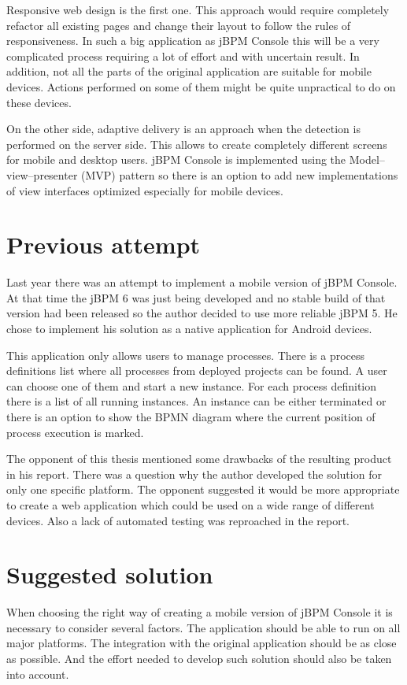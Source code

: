 \documentclass[12pt,oneside,final]{fithesis2}
\begin{document}
Responsive web design is the first one.
This approach would require completely refactor all existing pages and change their layout to follow the rules of responsiveness.
In such a big application as jBPM Console this will be a very complicated process requiring a lot of effort and with uncertain result.
In addition, not all the parts of the original application are suitable for mobile devices.
Actions performed on some of them might be quite unpractical to do on these devices.

On the other side, adaptive delivery is an approach when the detection is performed on the server side.
This allows to create completely different screens for mobile and desktop users.
jBPM Console is implemented using the Model–view–presenter (MVP) pattern so there is an option to add new implementations of view interfaces optimized especially for mobile devices.

\section{Previous attempt}
Last year there was an attempt to implement a mobile version of jBPM Console. \cite{petovsky13}
At that time the jBPM 6 was just being developed and no stable build of that version had been released so the author decided to use more reliable jBPM 5.
He chose to implement his solution as a native application for Android devices.

This application only allows users to manage processes.
There is a process definitions list where all processes from deployed projects can be found.
A user can choose one of them and start a new instance.
For each process definition there is a list of all running instances.
An instance can be either terminated or there is an option to show the BPMN diagram where the current position of process execution is marked.

The opponent of this thesis mentioned some drawbacks of the resulting product in his report.
There was a question why the author developed the solution for only one specific platform.
The opponent suggested it would be more appropriate to create a web application which could be used on a wide range of different devices.
Also a lack of automated testing was reproached in the report.

\section{Suggested solution}
When choosing the right way of creating a mobile version of jBPM Console it is necessary to consider several factors.
The application should be able to run on all major platforms.
The integration with the original application should be as close as possible.
And the effort needed to develop such solution should also be taken into account.
\end{document}
